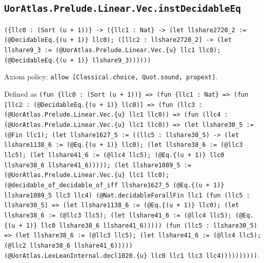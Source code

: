 \documentclass[11pt]{article}
\begin{document}
\subsection*{\texttt{UorAtlas.Prelude.Linear.Vec.instDecidableEq}}
\noindent\texttt{(\{llc0 : (Sort (u + 1))\} -> (\{llc1 : Nat\} -> (let llshare2720\_2 := (@DecidableEq.\{(u + 1)\} llc0); ([llc2 : llshare2720\_2] -> (let llshare9\_3 := (@UorAtlas.Prelude.Linear.Vec.\{u\} llc1 llc0); (@DecidableEq.\{(u + 1)\} llshare9\_3))))))}\par
\noindent Axiom policy: \texttt{allow [Classical.choice, Quot.sound, propext]}.\par
\noindent Defined as \texttt{(fun \{llc0 : (Sort (u + 1))\} => (fun \{llc1 : Nat\} => (fun [llc2 : (@DecidableEq.\{(u + 1)\} llc0)] => (fun (llc3 : (@UorAtlas.Prelude.Linear.Vec.\{u\} llc1 llc0)) => (fun (llc4 : (@UorAtlas.Prelude.Linear.Vec.\{u\} llc1 llc0)) => (let llshare30\_5 := (@Fin llc1); (let llshare1627\_5 := ((llc5 : llshare30\_5) -> (let llshare1138\_6 := (@Eq.\{(u + 1)\} llc0); (let llshare38\_6 := (@llc3 llc5); (let llshare41\_6 := (@llc4 llc5); (@Eq.\{(u + 1)\} llc0 llshare38\_6 llshare41\_6))))); (let llshare1089\_5 := (@UorAtlas.Prelude.Linear.Vec.\{u\} llc1 llc0); (@decidable\_of\_decidable\_of\_iff llshare1627\_5 (@Eq.\{(u + 1)\} llshare1089\_5 llc3 llc4) (@Nat.decidableForallFin llc1 (fun (llc5 : llshare30\_5) => (let llshare1138\_6 := (@Eq.\{(u + 1)\} llc0); (let llshare38\_6 := (@llc3 llc5); (let llshare41\_6 := (@llc4 llc5); (@Eq.\{(u + 1)\} llc0 llshare38\_6 llshare41\_6))))) (fun (llc5 : llshare30\_5) => (let llshare38\_6 := (@llc3 llc5); (let llshare41\_6 := (@llc4 llc5); (@llc2 llshare38\_6 llshare41\_6))))) (@UorAtlas.LexLeanInternal.decl1020.\{u\} llc0 llc1 llc3 llc4))))))))))}.\par
\end{document}
